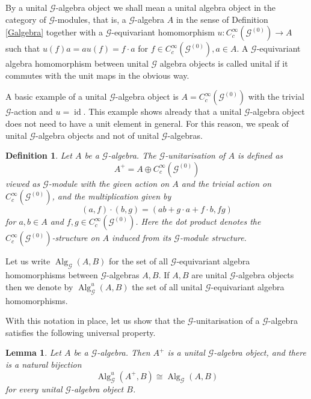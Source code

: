 \documentclass{amsart}
\newtheorem{dfn}[thm]{Definition}
\newtheorem{lemma}[thm]{Lemma}
\newcommand{\G}{\mathcal{G}}
\newcommand{\ccinfty}{C_c^\infty}
\DeclareMathOperator{\id}{id}
\DeclareMathOperator{\Alg}{Alg}
\begin{document}
By a unital $ \G $-algebra object we shall mean a unital algebra object in the category of $ \G $-modules, that is, a $ \G $-algebra $ A $ in the sense of Definition \ref{Galgebra} together with a $ \G $-equivariant homomorphism $ u: \ccinfty(\G^{(0)}) \rightarrow A $ such that $ u(f) a = a u(f) = f \cdot a $ for $ f \in  \ccinfty(\G^{(0)}), a \in A $. 
A $ \G $-equivariant algebra homomorphism between unital $ \G $ algebra objects is called unital if it commutes with the unit maps in the obvious way. 

A basic example of a unital $ \G $-algebra object is $ A = \ccinfty(\G^{(0)}) $ with the trivial $ \G $-action and $ u = \id $. This example shows already that a unital $ \G $-algebra object does not need to have a unit element in general. For this reason, we speak of unital $ \G $-algebra objects and not of unital $ \G $-algebras. 

\begin{dfn}
Let $ A $ be a $ \G $-algebra. The $ \G $-unitarisation of $ A $ is defined as 
$$
A^+= A \oplus \ccinfty(\G^{(0)})
$$ 
viewed as $ \G $-module with the given action on $ A $ and the trivial action on $ \ccinfty(\G^{(0)}) $, and the multiplication given by
$$
(a, f) \cdot(b, g) = (ab + g \cdot a + f \cdot b, fg)
$$ 
for $ a,b \in A $ and $ f,g \in \ccinfty(\G^{(0)}) $. Here the dot product denotes the $ \ccinfty(\G^{(0)}) $-structure on $ A $ induced from its $ \G $-module structure.    
\end{dfn}

Let us write $ \Alg_\G(A,B) $ for the set of all $ \G $-equivariant algebra homomorphisms between $ \G $-algebras $ A, B $. If $ A, B $ are unital $ \G $-algebra objects then we denote by $ \Alg^u_\G(A,B) $ the set of all unital $ \G $-equivariant algebra homomorphisms. 

With this notation in place, let us show that the $ \G $-unitarisation of a $ \G $-algebra satisfies the following universal property. 

\begin{lemma}
Let $ A $ be a $ \G $-algebra. Then $ A^+ $ is a unital $ \G $-algebra object, and there is a natural bijection
$$
\Alg^u_\G( A^+, B) \cong \Alg_\G(A, B) 
$$
for every unital $ \G $-algebra object $ B $. 
\end{lemma}
\end{document}

